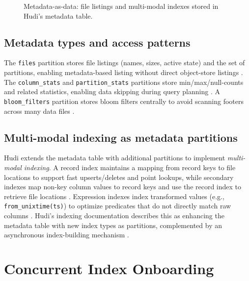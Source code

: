 \documentclass[sigconf]{acmart}
\begin{document}
\begin{figure}[t]
  \centering
  \caption{Metadata-as-data: file listings and multi-modal indexes stored in Hudi's metadata table.}
  \label{fig:mdt}
\end{figure}

\subsection{Metadata types and access patterns}
The \texttt{files} partition stores file listings (names, sizes, active state) and the set of partitions, enabling metadata-based listing without direct object-store listings \cite{hudi-metadata}.
The \texttt{column\_stats} and \texttt{partition\_stats} partitions store min/max/null-counts and related statistics, enabling data skipping during query planning \cite{hudi-metadata}.
A \texttt{bloom\_filters} partition stores bloom filters centrally to avoid scanning footers across many data files \cite{hudi-indexes}.

\subsection{Multi-modal indexing as metadata partitions}
Hudi extends the metadata table with additional partitions to implement \emph{multi-modal indexing}.
A record index maintains a mapping from record keys to file locations to support fast upserts/deletes and point lookups, while secondary indexes map non-key column values to record keys and use the record index to retrieve file locations \cite{hudi-indexes}.
Expression indexes index transformed values (e.g., \texttt{from\_unixtime(ts)}) to optimize predicates that do not directly match raw columns \cite{hudi-indexes}.
Hudi's indexing documentation describes this as enhancing the metadata table with new index types as partitions, complemented by an asynchronous index-building mechanism \cite{hudi-indexes}.

\section{Concurrent Index Onboarding}
\end{document}
